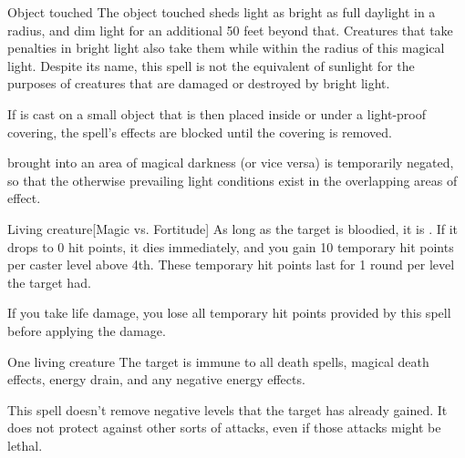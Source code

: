\spellrng{\rngtouch}
\spelldur{\durlong \dismissable}
\begin{spelltarget}{Object touched}
    \spelleffect The object touched sheds light as bright as full daylight in a \arealarge radius, and dim light for an additional 50 feet beyond that. Creatures that take penalties in bright light also take them while within the radius of this magical light. Despite its name, this spell is not the equivalent of sunlight for the purposes of creatures that are damaged or destroyed by bright light.
    \par If  is cast on a small object that is then placed inside or under a light-proof covering, the spell's effects are blocked until the covering is removed.
\end{spelltarget}
\spellnotes {} brought into an area of magical darkness (or vice versa) is temporarily negated, so that the otherwise prevailing light conditions exist in the overlapping areas of effect.

\spellrng{\rngmed}
\begin{spelltarget}{Living creature}[Magic vs. Fortitude]
    \spellsuccess As long as the target is bloodied, it is \vulnerable. If it drops to 0 hit points, it dies immediately, and you gain 10 temporary hit points  per caster level above 4th. These temporary hit points last for 1 round per level the target had.
\end{spelltarget}
\spellnotes If you take life damage, you lose all temporary hit points provided by this spell before applying the damage.

\spellrng{\rngclose}
\spelldur{\durshort}
\begin{spelltarget}{One living creature}
    \spelleffect The target is immune to all death spells, magical death effects, energy drain, and any negative energy effects.
\end{spelltarget}
\spellnotes This spell doesn't remove negative levels that the target has already gained. It does not protect against other sorts of attacks, even if those attacks might be lethal.


